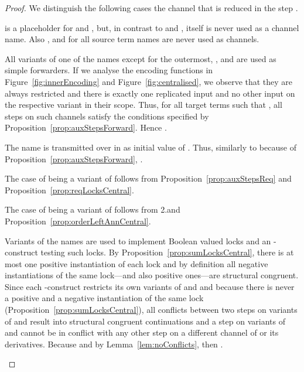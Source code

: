 \documentclass[]{eptcs}
\begin{document}
\begin{proof}
	We distinguish the following cases \wrt the channel  that is reduced in the step .
	\begin{compactenum}

		\item  is a placeholder for  and , but, in contrast to  and ,  itself is never used as a channel name. Also , and  for all source term names  are never used as channels.
		\item All variants of one of the names  except for the outermost, , and  are used as simple forwarders. If we analyse the encoding functions in Figure~\ref{fig:innerEncoding} and Figure~\ref{fig:centralised}, we observe that they are always restricted and there is exactly one replicated input and no other input on the respective variant in their scope. Thus, for all target terms  such that , all steps on such channels satisfy the conditions specified by Proposition~\ref{prop:auxStepsForward}. Hence .
		\item The name  is transmitted over  in  as initial value of . Thus, similarly to  because of Proposition~\ref{prop:auxStepsForward}, .
		\item The case of  being a variant of  follows from Proposition~\ref{prop:auxStepsReq} and Proposition~\ref{prop:reqLocksCentral}.
		\item The case of  being a variant of  follows from 2.\@ and Proposition~\ref{prop:orderLeftAnnCentral}.
		\item Variants of the names  are used to implement Boolean valued locks and an -construct testing such locks. By Proposition~\ref{prop:sumLocksCentral}, there is at most one positive instantiation of each lock and by definition all negative instantiations of the same lock---and also positive ones---are structural congruent. Since each -construct restricts its own variants of  and  and because there is never a positive and a negative instantiation of the same lock (Proposition~\ref{prop:sumLocksCentral}), all conflicts between two steps on variants of  and  result into structural congruent continuations and a step on variants of  and  cannot be in conflict with any other step on a different channel of  or its derivatives. Because  and by Lemma~\ref{lem:noConflicts}, then .

\end{compactenum}
\end{proof}
\end{document}
